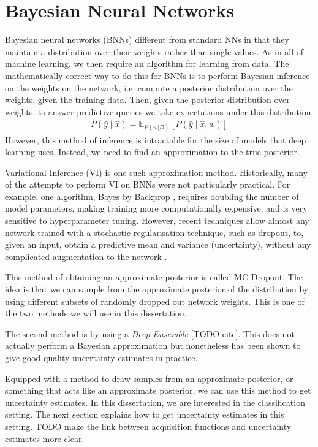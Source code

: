 \documentclass[11pt, a4paper, bibliography=totoc]{report}
\newcommand{\E}[2]{\mathbb{E}_{#1} \left[ #2 \right] }
\begin{document}
\section{Bayesian Neural Networks}
Bayesian neural networks (BNNs) different from standard NNs in that they maintain a distribution over their weights rather than single values. As in all of machine learning, we then require an algorithm for learning from data. The mathematically correct way to do this for BNNs is to perform Bayesian inference on the weights on the network, i.e. compute a posterior distribution over the weights, given the training data. Then, given the posterior distribution over weights, to answer predictive queries we take expectations under this distribution:
\begin{align*}
P(\hat{y} \mid \hat{x}) = \E{ P(w|D) }{P(\hat{y} \mid \hat{x}, w) }
\end{align*}
However, this method of inference is intractable for the size of models that deep learning uses. Instead, we need to find an approximation to the true posterior.

Variational Inference (VI) is one such approximation method. Historically, many of the attempts to perform VI on BNNs were not particularly practical. For example, one algorithm, Bayes by Backprop \cite{Blundell2015}, requires doubling the number of model parameters, making training more computationally expensive, and is very sensitive to hyperparameter tuning. However, recent techniques allow almost any network trained with a stochastic regularisation technique, such as dropout, to, given an input, obtain a predictive mean and variance (uncertainty), without any complicated augmentation to the network \cite[p.~15]{Gal2017a}.

This method of obtaining an approximate posterior is called MC-Dropout. The idea is that we can sample from the approximate posterior of the distribution by using different subsets of randomly dropped out network weights. This is one of the two methods we will use in this dissertation.

The second method is by using a \textit{Deep Ensemble} [TODO cite]. This does not actually perform a Bayesian approximation but nonetheless has been shown to give good quality uncertainty estimates in practice.

Equipped with a method to draw samples from an approximate posterior, or something that acts like an approximate posterior, we can use this method to get uncertainty estimates. In this dissertation, we are interested in the classification setting. The next section explains how to get uncertainty estimates in this setting. TODO make the link between acquisition functions and uncertainty estimates more clear.
\end{document}
